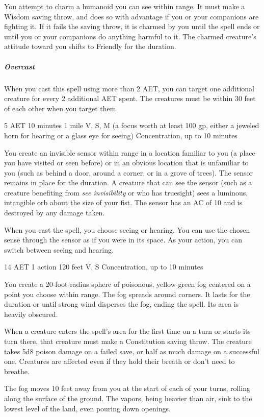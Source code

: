 You attempt to charm a humanoid you can see within range. It must make a Wisdom saving throw, and does so with advantage if you or your companions are fighting it. If it fails the saving throw, it is charmed by you until the spell ends or until you or your companions do anything harmful to it. The charmed creature's attitude toward you shifts to Friendly for the duration.

\subparagraph*{Overcast} When you cast this spell using more than 2 AET, you can target one additional creature for every 2 additional AET spent. The creatures must be within 30 feet of each other when you target them.


{5 AET}
{10 minutes}
{1 mile}
{V, S, M (a focus worth at least 100 gp, either a jeweled horn for hearing or a glass eye for seeing)}
{Concentration, up to 10 minutes}

You create an invisible sensor within range in a location familiar to you (a place you have visited or seen before) or in an obvious location that is unfamiliar to you (such as behind a door, around a corner, or in a grove of trees). The sensor remains in place for the duration. A creature that can see the sensor (such as a creature benefiting from \textit{see invisibility} or who has truesight) sees a luminous, intangible orb about the size of your fist. The sensor has an AC of 10 and is destroyed by any damage taken.

When you cast the spell, you choose seeing or hearing. You can use the chosen sense through the sensor as if you were in its space. As your action, you can switch between seeing and hearing.


{14 AET}
{1 action}
{120 feet}
{V, S}
{Concentration, up to 10 minutes}

You create a 20-foot-radius sphere of poisonous, yellow-green fog centered on a point you choose within range. The fog spreads around corners. It lasts for the duration or until strong wind disperses the fog, ending the spell. Its area is heavily obscured.

When a creature enters the spell's area for the first time on a turn or starts its turn there, that creature must make a Constitution saving throw. The creature takes 5d8 poison damage on a failed save, or half as much damage on a successful one. Creatures are affected even if they hold their breath or don't need to breathe.

The fog moves 10 feet away from you at the start of each of your turns, rolling along the surface of the ground. The vapors, being heavier than air, sink to the lowest level of the land, even pouring down openings.

